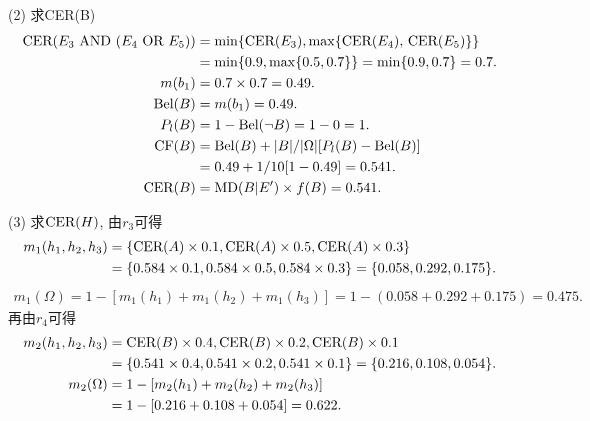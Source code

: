 (2) 求\textup{CER}(B)
\begin{align*}
 \textup{CER}(E_3 \,\, \textup{AND}\,\,  (E_4\,\,  \textup{OR}\,\,  E_5))&=\min\{\textup{CER}(E_3), \max\{\textup{CER}(E_4),\, \textup{CER}(E_5)\}\}\\
                                                        &=\min\{0.9, \max\{0.5, 0.7\}\}=\min\{0.9, 0.7\}=0.7. \\
 m({b_1})&=0.7\times 0.7=0.49.\\
   \textup{Bel}(B)&=m({b_1})=0.49.\\
   P_l(B)&=1-\textup{Bel}(\neg B)=1-0=1.\\
   \textup{CF}(B)&=\textup{Bel}(B)+|B|/|\Omega|[P_l(B)-\textup{Bel}(B)]\\
       &=0.49+1/10[1-0.49]=0.541.\\
 \textup{CER}(B)&=\textup{MD}(B|E')\times f(B)=0.541.
\end{align*}

(3) 求$\textup{CER}(H)$, 由$r_3$可得
\begin{align*}
    m_1({h_1}, {h_2}, {h_3})&=\{\textup{CER}(A)\times 0.1, \textup{CER}(A)\times 0.5, \textup{CER}(A)\times 0.3\}\\
                      &=\{0.584\times 0.1, 0.584\times 0.5, 0.584\times 0.3\}=\{0.058, 0.292, 0.175\}.
\end{align*}
\begin{align*}
    m_1(\Omega)=1-[m_1({h_1})+m_1({h_2})+m_1({h_3})] =1-(0.058+0.292+0.175)=0.475.
\end{align*}
再由$r_4$可得
\begin{align*}
  m_2({h_1}, {h_2}, {h_3})&={\textup{CER}(B)\times 0.4, \textup{CER}(B)\times 0.2, \textup{CER}(B)\times 0.1}\\
        &=\{0.541\times 0.4, 0.541\times 0.2, 0.541\times 0.1\}=\{0.216, 0.108, 0.054\}.\\
  m_2(\Omega) &=1-[m_2({h_1})+m_2({h_2})+m_2({h_3})]\\
              &=1-[0.216+0.108+0.054]=0.622.
\end{align*}

